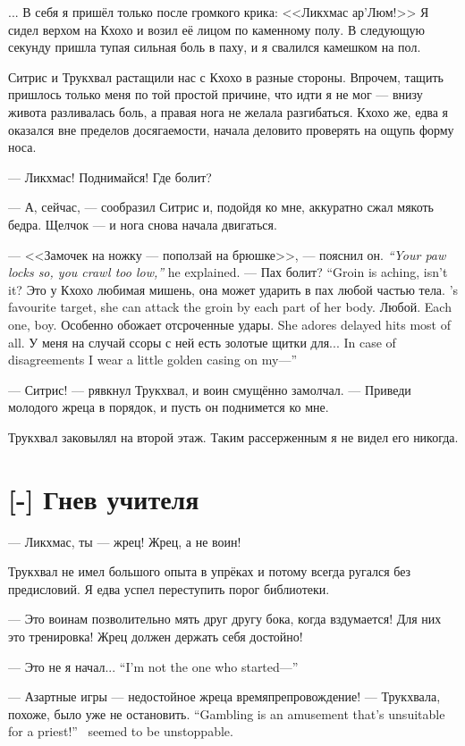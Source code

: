 ... В себя я пришёл только после громкого крика: <<Ликхмас ар’Люм!>>
Я сидел верхом на Кхохо и возил её лицом по каменному полу.
В следующую секунду пришла тупая сильная боль в паху, и я свалился камешком на пол.

Ситрис и Трукхвал растащили нас с Кхохо в разные стороны.
Впрочем, тащить пришлось только меня по той простой причине, что идти я не мог --- внизу живота разливалась боль, а правая нога не желала разгибаться.
Кхохо же, едва я оказался вне пределов досягаемости, начала деловито проверять на ощупь форму носа.

--- Ликхмас!
Поднимайся!
Где болит?

--- А, сейчас, --- сообразил Ситрис и, подойдя ко мне, аккуратно сжал мякоть бедра.
Щелчок --- и нога снова начала двигаться.

{--- <<Замочек на ножку --- поползай на брюшке>>, --- пояснил он.}
{\emph{``Your paw locks so, you crawl too low,''} he explained.}
{--- Пах болит?}
{``Groin is aching, isn't it?}
{Это у Кхохо любимая мишень, она может ударить в пах любой частью тела.}
{\Kchoho's favourite target, she can attack the groin by each part of her body.}
{Любой.}
{Each one, boy.}
{Особенно обожает отсроченные удары.}
{She adores delayed hits most of all.}
{У меня на случай ссоры с ней есть золотые щитки для...}
{In case of disagreements I wear a little golden casing on my---''}

--- Ситрис! --- рявкнул Трукхвал, и воин смущённо замолчал.
--- Приведи молодого жреца в порядок, и пусть он поднимется ко мне.

Трукхвал заковылял на второй этаж.
Таким рассерженным я не видел его никогда.

\section{[-] Гнев учителя}

--- Ликхмас, ты --- жрец!
Жрец, а не воин!

Трукхвал не имел большого опыта в упрёках и потому всегда ругался без предисловий.
Я едва успел переступить порог библиотеки.

--- Это воинам позволительно мять друг другу бока, когда вздумается!
Для них это тренировка!
Жрец должен держать себя достойно!

{--- Это не я начал...}
{``I'm not the one who started---''}

{--- Азартные игры --- недостойное жреца времяпрепровождение! --- Трукхвала, похоже, было уже не остановить.}
{``Gambling is an amusement that's unsuitable for a priest!'' \Trukchual\ seemed to be unstoppable.}


